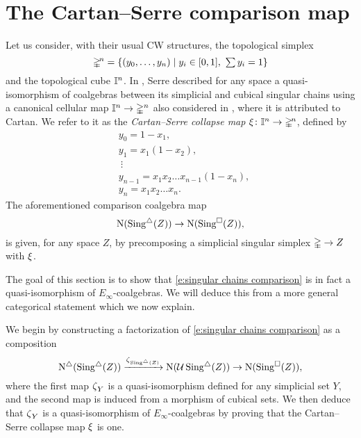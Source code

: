
\section{The Cartan--Serre comparison map} \label{s:the cartan-serre comparison map}

Let us consider, with their usual CW structures, the topological simplex
\[
\mathbb{\Delta}^{\!n} = \{(y_0, \dots, y_n) \mid y_i \in [0,1], \ \textstyle{\sum} \, y_i = 1\}
\]
and the topological cube $\mathbb{I}^n$.
In \cite[p. 442]{serre1951homologie}, Serre described for any space a quasi-isomorphism of coalgebras between its simplicial and cubical singular chains using a canonical cellular map $\mathbb{I}^n \to \mathbb{\Delta}^n$ also considered in \cite[p.199]{eilenberg1953acyclic}, where it is attributed to Cartan.
We refer to it as the \textit{Cartan--Serre collapse map} $\operatorname{\xi} \colon \mathbb{I}^n \to \mathbb{\Delta}^{\!n}$, defined by
\begin{equation} \label{e:cartan-serre collapse map}
\begin{split}
&y_0 = 1 - x_1, \\
&y_1 = x_1(1 - x_2), \\
&\ \vdots \\
&y_{n-1} = x_1 x_2 \dots x_{n-1}(1-x_n), \\
&y_{n} = x_1 x_2 \dots x_n.
\end{split}
\end{equation}
The aforementioned comparison coalgebra map
\begin{equation} \label{e:singular chains comparison}
\operatorname{N}(\operatorname{Sing^{\triangle}}(Z)) \to
\operatorname{N}(\operatorname{Sing^{\square}}(Z)),
\end{equation}
is given, for any space $Z$, by precomposing a simplicial singular simplex $\mathbb{\Delta} \to Z$ with $\operatorname{\xi}$.

The goal of this section is to show that \eqref{e:singular chains comparison} is in fact a quasi-isomorphism of $E_\infty$-coalgebras.
We will deduce this from a more general categorical statement which we now explain.

We begin by constructing a factorization of \eqref{e:singular chains comparison} as a composition
\[
\operatorname{N^{\triangle}}(\operatorname{Sing^{\triangle}}(Z)) \xrightarrow{\operatorname{\zeta}_{\operatorname{Sing^{\triangle}}(Z)}}
\operatorname{N}(\operatorname{\mathcal{U}} \operatorname{Sing^{\triangle}}(Z)) \to
\operatorname{N}(\operatorname{Sing^{\square}}(Z)),
\]
where the first map $\operatorname{\zeta}_Y$ is a quasi-isomorphism defined for any simplicial set $Y$, and the second map is induced from a morphism of cubical sets.
We then deduce that $\operatorname{\zeta}_Y$ is a quasi-isomorphism of $E_\infty$-coalgebras by proving that the Cartan--Serre collapse map $\operatorname{\xi}$ is one.


